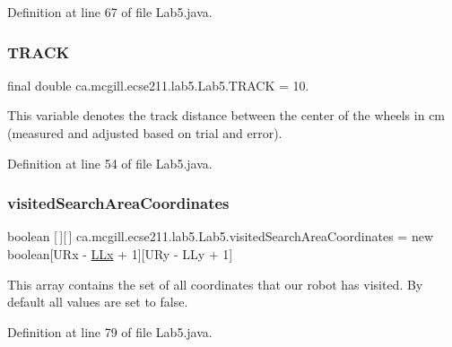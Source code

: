 Definition at line 67 of file Lab5.\+java.

\mbox{\label{classca_1_1mcgill_1_1ecse211_1_1lab5_1_1_lab5_a3d2e7eb578ce6ef7f7453feed3835e1d}} 
\subsubsection{\texorpdfstring{T\+R\+A\+CK}{TRACK}}
{\footnotesize\ttfamily final double ca.\+mcgill.\+ecse211.\+lab5.\+Lab5.\+T\+R\+A\+CK = 10.\hspace{0.3cm}{\ttfamily [static]}}

This variable denotes the track distance between the center of the wheels in cm (measured and adjusted based on trial and error). 

Definition at line 54 of file Lab5.\+java.

\mbox{\label{classca_1_1mcgill_1_1ecse211_1_1lab5_1_1_lab5_a27ae00bb6fbeed54573af9cc5c3dc32e}} 
\subsubsection{\texorpdfstring{visited\+Search\+Area\+Coordinates}{visitedSearchAreaCoordinates}}
{\footnotesize\ttfamily boolean \mbox{[}$\,$\mbox{]}\mbox{[}$\,$\mbox{]} ca.\+mcgill.\+ecse211.\+lab5.\+Lab5.\+visited\+Search\+Area\+Coordinates = new boolean\mbox{[}U\+Rx -\/ \hyperlink{classca_1_1mcgill_1_1ecse211_1_1lab5_1_1_lab5_a957a526ed669e9d8b7fc485e21385ee9}{L\+Lx} + 1\mbox{]}\mbox{[}U\+Ry -\/ L\+Ly + 1\mbox{]}\hspace{0.3cm}{\ttfamily [static]}}

This array contains the set of all coordinates that our robot has visited. By default all values are set to false. 

Definition at line 79 of file Lab5.\+java.

